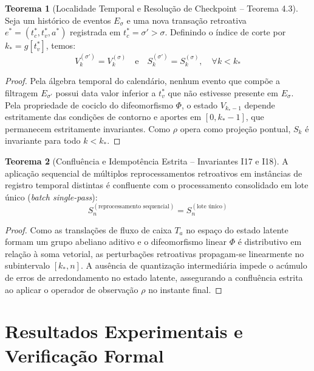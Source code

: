 \documentclass[11pt,a4paper]{article}
\theoremstyle{definition}
\newtheorem{theorem}{Teorema}[section]
\theoremstyle{remark}
\begin{document}
\begin{theorem}[Localidade Temporal e Resolução de Checkpoint -- Teorema 4.3]
Seja um histórico de eventos $E_\sigma$ e uma nova transação retroativa $e^* = (t_c^*, t_v^*, a^*)$ registrada em $t_c^* = \sigma' > \sigma$. Definindo o índice de corte por $k_* = g[t_v^*]$, temos:
\begin{equation}
    V_k^{(\sigma')} = V_k^{(\sigma)} \quad \text{e} \quad S_k^{(\sigma')} = S_k^{(\sigma)}, \quad \forall k < k_*
\end{equation}
\end{theorem}

\begin{proof}
Pela álgebra temporal do calendário, nenhum evento que compõe a filtragem $E_{\sigma'}$ possui data valor inferior a $t_v^*$ que não estivesse presente em $E_\sigma$. Pela propriedade de cociclo do difeomorfismo $\Phi$, o estado $V_{k_*-1}$ depende estritamente das condições de contorno e aportes em $[0, k_*-1]$, que permanecem estritamente invariantes. Como $\rho$ opera como projeção pontual, $S_k$ é invariante para todo $k < k_*$.
\end{proof}

\begin{theorem}[Confluência e Idempotência Estrita -- Invariantes I17 e I18]
A aplicação sequencial de múltiplos reprocessamentos retroativos em instâncias de registro temporal distintas é confluente com o processamento consolidado em lote único (\emph{batch single-pass}):
\begin{equation}
    S_n^{(\text{reprocessamento sequencial})} = S_n^{(\text{lote único})}
\end{equation}
\end{theorem}

\begin{proof}
Como as translações de fluxo de caixa $T_a$ no espaço do estado latente formam um grupo abeliano aditivo e o difeomorfismo linear $\Phi$ é distributivo em relação à soma vetorial, as perturbações retroativas propagam-se linearmente no subintervalo $[k_*, n]$. A ausência de quantização intermediária impede o acúmulo de erros de arredondamento no estado latente, assegurando a confluência estrita ao aplicar o operador de observação $\rho$ no instante final.
\end{proof}

\section{Resultados Experimentais e Verificação Formal}
\end{document}

